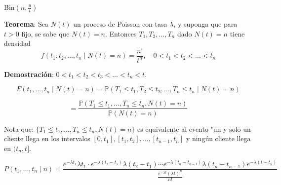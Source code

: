 \documentclass[12pt,a4paper]{article}
\newcommand{\teorema}[1]{%
\begin{teoremabox}
\textbf{Teorema}: #1
\end{teoremabox}
}
\begin{document}
\vspace{1cm}

\begin{center}
\end{center}

Bin$(n, \frac{u}{t})$

\teorema{Sea $N(t)$ un proceso de Poisson con tasa $\lambda$, y suponga que para $t > 0$ fijo, se sabe que $N(t) = n$. Entonces $T_1, T_2, \ldots, T_n$ dado $N(t) = n$ tiene densidad
\begin{equation*}
f(t_1, t_2, \ldots, t_n \mid N(t) = n) = \frac{n!}{t^n}, \quad 0 < t_1 < t_2 < \ldots < t_n
\end{equation*}}

\textbf{Demostración}: $0 < t_1 < t_2 < t_3 < \ldots < t_n < t$.

\begin{equation*}
F(t_1, \ldots, t_n \mid N(t) = n) = \mathbb{P}(T_1 \leq t_1, T_2 \leq t_2, \ldots, T_n \leq t_n \mid N(t) = n)
\end{equation*}

\begin{equation*}
= \frac{\mathbb{P}(T_1 \leq t_1, \ldots, T_n \leq t_n, N(t) = n)}{\mathbb{P}(N(t) = n)}
\end{equation*}

Nota que: $\{T_1 \leq t_1, \ldots, T_n \leq t_n, N(t) = n\}$ es equivalente al evento "un y solo un cliente llega en los intervalos $[0, t_1], [t_1, t_2], \ldots, [t_{n-1}, t_n]$ y ningún cliente llega en $(t_n, t]$.

\begin{equation*}
P(t_1, \ldots, t_n \mid n) = \frac{e^{-\lambda t_1} \lambda t_1 \cdot e^{-\lambda(t_2-t_1)} \lambda(t_2-t_1) \cdots e^{-\lambda(t_n-t_{n-1})} \lambda(t_n-t_{n-1}) e^{-\lambda(t-t_n)}}{\frac{e^{-\lambda t} (\lambda t)^n}{n!}}
\end{equation*}
\end{document}
